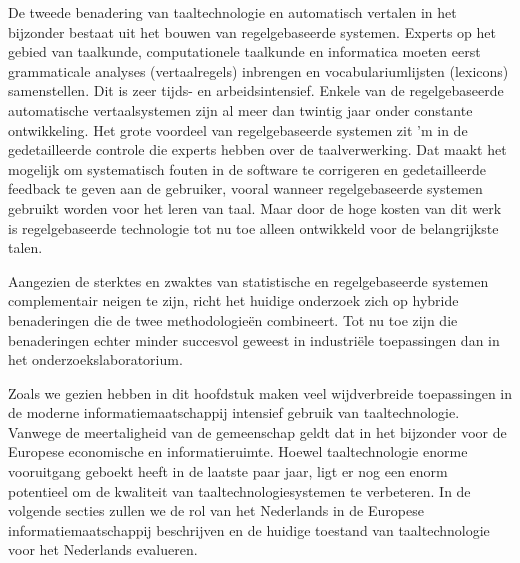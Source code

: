 \begin{multicols}{2}
    De tweede benadering van taaltechnologie en automatisch vertalen in het bijzonder bestaat uit het bouwen van regelgebaseerde systemen. Experts op het gebied van taalkunde, computationele taalkunde en informatica moeten eerst grammaticale analyses (vertaalregels) inbrengen en vocabulariumlijsten (lexicons) samenstellen. Dit is zeer tijds- en arbeidsintensief. Enkele van de regelgebaseerde automatische vertaalsystemen zijn al meer dan twintig jaar onder constante ontwikkeling. Het grote voordeel van regelgebaseerde systemen zit 'm in de gedetailleerde controle die experts hebben over de taalverwerking. Dat maakt het mogelijk om systematisch fouten in de software te corrigeren en gedetailleerde feedback te geven aan de gebruiker, vooral wanneer regelgebaseerde systemen gebruikt worden voor het leren van taal. Maar door de hoge kosten van dit werk is regelgebaseerde technologie tot nu toe alleen ontwikkeld voor de belangrijkste talen.

    Aangezien de sterktes en zwaktes van statistische en regelgebaseerde systemen complementair neigen te zijn, richt het huidige onderzoek zich op hybride benaderingen die de twee methodologie{\"e}n combineert. Tot nu toe zijn die benaderingen echter minder succesvol geweest in industri{\"e}le toepassingen dan in het onderzoekslaboratorium.

    Zoals we gezien hebben in dit hoofdstuk maken veel wijdverbreide toepassingen in de moderne informatiemaatschappij intensief gebruik van taaltechnologie. Vanwege de meertaligheid van de gemeenschap geldt dat in het bijzonder voor de Europese economische en informatieruimte. Hoewel taaltechnologie enorme vooruitgang geboekt heeft in de laatste paar jaar, ligt er nog een enorm potentieel om de kwaliteit van taaltechnologiesystemen te verbeteren. In de volgende secties zullen we de rol van het Nederlands in de Europese informatiemaatschappij beschrijven en de huidige toestand van taaltechnologie voor het Nederlands evalueren.

\end{multicols}

\clearpage



